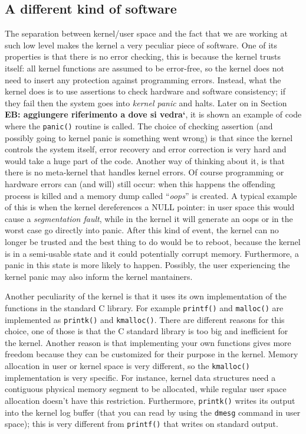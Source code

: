 \documentclass[10pt]{book}
\newcommand{\mycomment}[1]{\textbf{#1}}  %
\begin{document}
\subsection{A different kind of software}
The separation between kernel/user space and the fact that we are working at such low level makes the kernel a very peculiar piece of software. One of its properties is that there is no error checking, this is because the kernel trusts itself: all kernel functions are assumed to be error-free, so the kernel does not need to insert any protection against programming errors\cite{cesati}. Instead, what the kernel does is to use assertions to check hardware and software consistency; if they fail then the system goes into \textit{kernel panic} and halts. Later on in Section \mycomment{EB: aggiungere riferimento a dove si vedra`}, it is shown an example of code where the \verb|panic()| routine is called. The choice of checking assertion (and possibly going to kernel panic is something went wrong) is that since the kernel controls the system itself, error recovery and error correction is very hard and would take a huge part of the code. Another way of thinking about it, is that there is no meta-kernel that handles kernel errors. Of course programming or hardware errors can (and will) still occur: when this happens the offending process is killed and a memory dump called ``\textit{oops}'' is created. A typical example of this is when the kernel dereferences a NULL pointer: in user space this would cause a \textit{segmentation fault}, while in the kernel it will generate an oops or in the worst case go directly into panic. After this kind of event, the kernel can no longer be trusted and the best thing to do would be to reboot, because the kernel is in a semi-usable state and it could potentially corrupt memory. Furthermore, a panic in this state is more likely to happen. %
Possibly, the user experiencing the kernel panic may also inform the kernel mantainers.

Another peculiarity of the kernel is that it uses its own implementation of the functions in the standard C library. For example \verb|printf()| and \verb|malloc()| are implemented as \verb|printk()| and \verb|kmalloc()|. There are different reasons for this choice, one of those is that the C standard library is too big and inefficient for the kernel. Another reason is that implementing your own functions gives more freedom because they can be customized for their purpose in the kernel. Memory allocation in user or kernel space is very different, so the \verb|kmalloc()| implementation is very specific. For instance, kernel data structures need a contiguous physical memory segment to be allocated, while regular user space allocation doesn't have this restriction. Furthermore, \verb|printk()| writes its output into the kernel log buffer (that you can read by using the \verb|dmesg| command in user space); this is very different from \verb|printf()| that writes on standard output.
\end{document}
